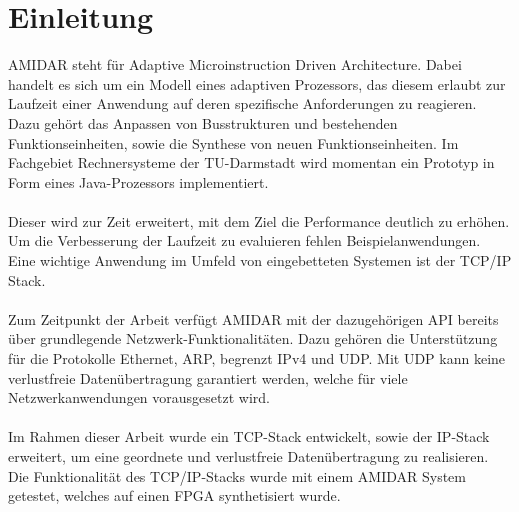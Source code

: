 \chapter{Einleitung}

AMIDAR steht für Adaptive Microinstruction Driven Architecture. Dabei handelt es sich um ein Modell eines adaptiven Prozessors, das diesem erlaubt zur Laufzeit einer Anwendung auf deren spezifische Anforderungen zu reagieren. Dazu gehört das Anpassen von Busstrukturen und bestehenden Funktionseinheiten, sowie die Synthese von neuen Funktionseinheiten.
Im Fachgebiet Rechnersysteme der TU-Darmstadt wird momentan ein Prototyp in Form eines Java-Prozessors implementiert. \\\\
Dieser wird zur Zeit erweitert, mit dem Ziel die Performance deutlich zu erhöhen. Um die Verbesserung der Laufzeit zu evaluieren fehlen Beispielanwendungen. Eine wichtige Anwendung im Umfeld von eingebetteten Systemen ist der TCP/IP Stack.\\\\
Zum Zeitpunkt der Arbeit verfügt AMIDAR mit der dazugehörigen API bereits über grundlegende Netzwerk-Funktionalitäten. Dazu gehören die Unterstützung für die Protokolle Ethernet, ARP, begrenzt IPv4 und UDP. Mit UDP kann keine verlustfreie Datenübertragung garantiert werden, welche für viele Netzwerkanwendungen vorausgesetzt wird.\\\\
Im Rahmen dieser Arbeit wurde ein TCP-Stack entwickelt, sowie der IP-Stack erweitert, um eine geordnete und verlustfreie Datenübertragung zu realisieren. Die Funktionalität des TCP/IP-Stacks wurde mit einem AMIDAR System getestet, welches auf einen FPGA synthetisiert wurde.
